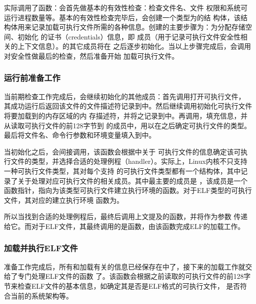 实际调用了函数：会首先做基本的有效性检查：检查文件名、文件
权限和系统可运行进程数量等。基本的有效性检查完毕后，会创建一个类型为的结
构体，该结构体用来记录加载可执行文件所需的各种信息。创建的主要步骤为：为分配存储空间、初始化
的证书（credentials）信息，即 成员（用于记录可执行文件安全性相关的上下文信息）。的其它成员将在
之后逐步初始化。当以上步骤完成后，会调用对安全性做最后的检查，然后准备开始
加载可执行文件。

\subsubsection{运行前准备工作}

当前期检查工作完成后，会继续初始化的其他成员：首先调用打开可执行文件，
其成功运行后返回该文件的文件描述符记录到中。然后继续调用初始化可执行文件将要加载到的内存区域的内
存描述符，并将之记录到中。再调用，填充信息，并从读取可执行文件的前128字节到
的成员中，用以在之后确定可执行文件的类型。最后将文件名、命令行参数和环境变量填入到中。

当初始化之后，会间接调用，该函数会根据中关于
可执行文件的信息确定该可执行文件的类型，并选择合适的处理例程（handler）。实际上，Linux内核不只支持一种可执行文件类型，其对每个支持
的可执行文件类型都有一个结构体，其中记录了关于处理对应可执行文件的相关成员。其中最主要的成员是
，该成员是一个函数指针，指向为该类型可执行文件建立执行环境的函数。对于ELF类型的可执行文件，其对应的建立执行环境
函数为。

所以当找到合适的处理例程后，最终后调用上文提及的函数，并将作为参数
传递给它。而对于ELF文件，其最终调用的是函数，由该函数完成ELF的加载工作。

\subsubsection{加载并执行ELF文件}

准备工作完成后，所有和加载有关的信息已经保存在中了，接下来的加载工作就交给了专门处理ELF文件的函数
了。该函数会根据之前读取的可执行文件的前128字节来检查ELF文件的基本信息，如确定其是否是ELF格式的可执行文件，
是否符合当前的系统架构等。

